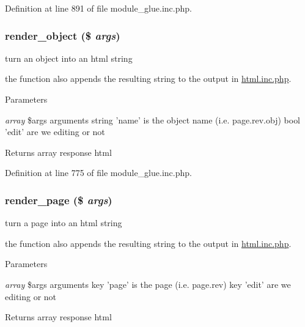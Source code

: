 Definition at line 891 of file module\_\-glue.inc.php.

\hypertarget{module__glue_8inc_8php_ae9103a74e4b40e88536fbc0a52d1c72f}{
\subsubsection[{render\_\-object}]{\setlength{\rightskip}{0pt plus 5cm}render\_\-object (\$ {\em args})}}
\label{module__glue_8inc_8php_ae9103a74e4b40e88536fbc0a52d1c72f}
turn an object into an html string

the function also appends the resulting string to the output in \hyperlink{html_8inc_8php}{html.inc.php}. 
\begin{DoxyParams}{Parameters}
\item[{\em array}]\$args arguments string 'name' is the object name (i.e. page.rev.obj) bool 'edit' are we editing or not \end{DoxyParams}
\begin{DoxyReturn}{Returns}
array response html 
\end{DoxyReturn}


Definition at line 775 of file module\_\-glue.inc.php.

\hypertarget{module__glue_8inc_8php_aab1981a767de519c6c4afb946d748d0a}{
\subsubsection[{render\_\-page}]{\setlength{\rightskip}{0pt plus 5cm}render\_\-page (\$ {\em args})}}
\label{module__glue_8inc_8php_aab1981a767de519c6c4afb946d748d0a}
turn a page into an html string

the function also appends the resulting string to the output in \hyperlink{html_8inc_8php}{html.inc.php}. 
\begin{DoxyParams}{Parameters}
\item[{\em array}]\$args arguments key 'page' is the page (i.e. page.rev) key 'edit' are we editing or not \end{DoxyParams}
\begin{DoxyReturn}{Returns}
array response html 
\end{DoxyReturn}


